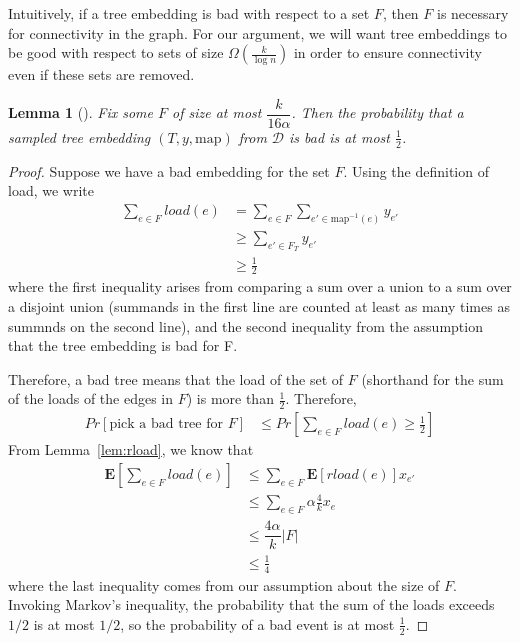 \documentclass[12pt]{article}
\newtheorem{lemma}{Lemma}
\begin{document}
Intuitively, if a tree embedding is bad with respect to a set $F$, then $F$ is necessary for connectivity in the graph. For our argument, we will want tree embeddings to be good with respect to sets of size $\Omega(\frac{k}{\log n})$ in order to ensure connectivity even if these sets are removed.

\begin{lemma}[\cite{ssc}]
\label{lem:notbad}
Fix some $F$ of size at most $\dfrac{k}{16 \alpha}$. Then the probability that a sampled tree embedding $(T, y, \text{map})$ from $\mathcal{D}$ is bad is at most $\frac{1}{2}$. 
\end{lemma} 

\begin{proof}
Suppose we have a bad embedding for the set $F$. Using the definition of load, we write
\begin{align}
\sum_{e \in F} load(e)&= \sum_{e \in F} \sum_{e' \in \text{map}^{-1}(e)} y_{e'} \\
                    &\geq \sum_{e' \in F_T} y_{e'} \\
                    &\geq \frac{1}{2}
\end{align}
where the first inequality arises from comparing a sum over a union to a sum over a disjoint union (summands in the first line are counted at least as many times as summnds on the second line), and the second inequality from the assumption that the tree embedding is bad for F.

Therefore, a bad tree means that the load of the set of $F$ (shorthand for the sum of the loads of the edges in $F$) is more than $\frac{1}{2}$. Therefore,
\begin{align}
Pr[\text{pick a bad tree for $F$}] &\leq Pr[ \sum_{e\in F} load(e) \geq \frac{1}{2}]
\end{align}
From Lemma~\ref{lem:rload}, we know that
\begin{align}
\textbf{E}[ \sum_{e \in F} load(e) ] &\leq \sum_{e \in F} \textbf{E}[rload(e)]x_{e'} \\
                                   & \leq \sum_{e\in F} \alpha \frac{4}{k} x_{e} \\
                                   & \leq \dfrac{4\alpha}{k} |F| \\
                                   &\leq \frac{1}{4}
\end{align}
where the last inequality comes from our assumption about the size of $F$. Invoking Markov's inequality, the probability that the sum of the loads exceeds $1/2$ is at most $1/2$, so the probability of a bad event is at most $\frac{1}{2}$. 
\end{proof}
\end{document}
